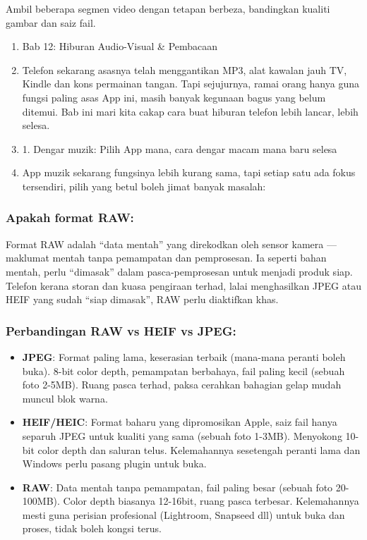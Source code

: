 \begin{tcbpractice}{Ambil beberapa segmen video dengan tetapan berbeza, bandingkan kualiti gambar dan saiz fail.}
\begin{enumerate}
  \item Bab 12: Hiburan Audio-Visual \& Pembacaan
  \item Telefon sekarang asasnya telah menggantikan MP3, alat kawalan jauh TV, Kindle dan kons permainan tangan. Tapi sejujurnya, ramai orang hanya guna fungsi paling asas App ini, masih banyak kegunaan bagus yang belum ditemui. Bab ini mari kita cakap cara buat hiburan telefon lebih lancar, lebih selesa.
  \item 1. Dengar muzik: Pilih App mana, cara dengar macam mana baru selesa
  \item App muzik sekarang fungsinya lebih kurang sama, tapi setiap satu ada fokus tersendiri, pilih yang betul boleh jimat banyak masalah:
\end{enumerate}

\end{tcbpractice}


\subsubsection*{Apakah format RAW:}

Format RAW adalah “data mentah” yang direkodkan oleh sensor kamera — maklumat mentah tanpa pemampatan dan pemprosesan. Ia seperti bahan mentah, perlu “dimasak” dalam pasca-pemprosesan untuk menjadi produk siap. Telefon kerana storan dan kuasa pengiraan terhad, lalai menghasilkan JPEG atau HEIF yang sudah “siap dimasak”, RAW perlu diaktifkan khas.

\subsubsection*{Perbandingan RAW vs HEIF vs JPEG:}

\begin{itemize}
  \item \textbf{JPEG}: Format paling lama, keserasian terbaik (mana-mana peranti boleh buka). 8-bit color depth, pemampatan berbahaya, fail paling kecil (sebuah foto 2-5MB). Ruang pasca terhad, paksa cerahkan bahagian gelap mudah muncul blok warna.
  \item \textbf{HEIF/HEIC}: Format baharu yang dipromosikan Apple, saiz fail hanya separuh JPEG untuk kualiti yang sama (sebuah foto 1-3MB). Menyokong 10-bit color depth dan saluran telus. Kelemahannya sesetengah peranti lama dan Windows perlu pasang plugin untuk buka.
  \item \textbf{RAW}: Data mentah tanpa pemampatan, fail paling besar (sebuah foto 20-100MB). Color depth biasanya 12-16bit, ruang pasca terbesar. Kelemahannya mesti guna perisian profesional (Lightroom, Snapseed dll) untuk buka dan proses, tidak boleh kongsi terus.
\end{itemize}

